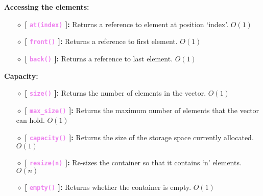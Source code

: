 \begin{center}
	\textbf{Accessing the elements:}
\end{center}
\begin{itemize}

	\item[{\LARGE $\diamond$}] \textbf{[ \textcolor{violet}{\texttt{at(index)}} ]:} Returns a reference to element at position `index'. $O(1)$
	
	\item[{\LARGE $\diamond$}] \textbf{[ \textcolor{violet}{\texttt{front()}} ]:} Returns a reference to first element.	$O(1)$
	
	\item[{\LARGE $\diamond$}] \textbf{[ \textcolor{violet}{\texttt{back()}} ]:} Returns a reference to last element.	$O(1)$
	
\end{itemize}

\begin{center}
	\textbf{Capacity:}
\end{center}
\begin{itemize}
	
	\item[{\LARGE $\diamond$}] \textbf{[ \textcolor{violet}{\texttt{size()}} ]:} Returns the number of elements in the vector. $O(1)$
	
	\item[{\LARGE $\diamond$}] \textbf{[ \textcolor{violet}{\texttt{max\_size()}} ]:} Returns the maximum number of elements that the vector can hold. $O(1)$
	
	\item[{\LARGE $\diamond$}] \textbf{[ \textcolor{violet}{\texttt{capacity()}} ]:} Returns the size of the storage space currently allocated. $O(1)$
	
	\item[{\LARGE $\diamond$}] \textbf{[ \textcolor{violet}{\texttt{resize(n)}} ]:} Re-sizes the container so that it contains `n' elements. $O(n)$
	
	\item[{\LARGE $\diamond$}] \textbf{[ \textcolor{violet}{\texttt{empty()}} ]:} Returns whether the container is empty. $O(1)$
	
\end{itemize}

